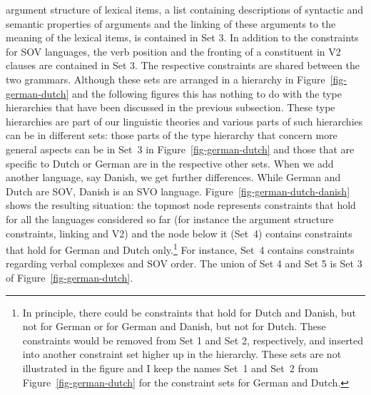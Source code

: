 argument structure of lexical items, a list containing descriptions of syntactic and semantic properties of
arguments and the linking of these arguments to the meaning of the lexical items, is contained in Set 3. In
addition to the constraints for SOV languages, the verb position and the fronting of a
constituent in V2 clauses are contained in Set 3. The respective constraints are shared between the
two grammars. Although these sets are arranged in a hierarchy in Figure~\ref{fig-german-dutch} and
the following figures this has nothing to do with the type hierarchies that have been discussed in the previous subsection. These type
hierarchies are part of our linguistic theories and various parts of such hierarchies can be in different
sets: those parts of the type hierarchy that concern more general aspects can be in Set~3 in
Figure~\ref{fig-german-dutch} and those that are specific to Dutch or German are in the respective
other sets. When we add another language, say Danish, we get further differences. While German and Dutch are SOV, Danish
is an SVO language. Figure~\vref{fig-german-dutch-danish} shows the resulting situation: the
topmost node represents constraints that hold for all the languages considered so far (for instance the argument
structure constraints, linking and V2) and the node below it (Set~4) contains
constraints that hold for German and Dutch only.\footnote{
  In principle, there could be constraints that hold for Dutch and Danish, but not for German or for
  German and Danish, but not for Dutch. These constraints would be removed from Set 1 and Set 2,
  respectively, and inserted into another constraint set higher up in the hierarchy. These sets are not
  illustrated in the figure and I keep the names Set~1 and Set~2 from Figure~\ref{fig-german-dutch} for the constraint sets for German
  and Dutch.
} For instance, Set~4 contains constraints regarding verbal complexes and SOV order.
The union of Set 4 and Set 5 is Set 3 of Figure~\ref{fig-german-dutch}.
